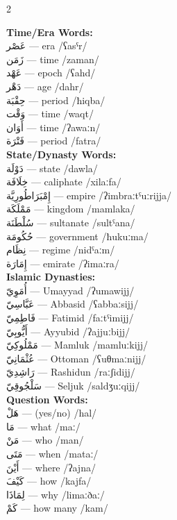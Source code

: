 \documentclass[letterpaper,12pt]{article}
\begin{document}
\begin{multicols}{2}

\textbf{Time/Era Words:}\\
\textarabic{عَصْر} — era /ʕasˤr/\\
\textarabic{زَمَن} — time /zaman/\\
\textarabic{عَهْد} — epoch /ʕahd/\\
\textarabic{دَهْر} — age /dahr/\\
\textarabic{حِقْبَة} — period /ħiqba/\\
\textarabic{وَقْت} — time /waqt/\\
\textarabic{أَوَان} — time /ʔawaːn/\\
\textarabic{فَتْرَة} — period /fatra/\\

\textbf{State/Dynasty Words:}\\
\textarabic{دَوْلَة} — state /dawla/\\
\textarabic{خِلَافَة} — caliphate /xilaːfa/\\
\textarabic{إِمْبَرَاطُورِيَّة} — empire /ʔimbraːtˤuːrijja/\\
\textarabic{مَمْلَكَة} — kingdom /mamlaka/\\
\textarabic{سُلْطَنَة} — sultanate /sultˤana/\\
\textarabic{حُكُومَة} — government /ħukuːma/\\
\textarabic{نِظَام} — regime /nidˤaːm/\\
\textarabic{إِمَارَة} — emirate /ʔimaːra/\\

\textbf{Islamic Dynasties:}\\
\textarabic{أُمَوِيّ} — Umayyad /ʔumawijj/\\
\textarabic{عَبَّاسِيّ} — Abbasid /ʕabbaːsijj/\\
\textarabic{فَاطِمِيّ} — Fatimid /faːtˤimijj/\\
\textarabic{أَيُّوبِيّ} — Ayyubid /ʔajjuːbijj/\\
\textarabic{مَمْلُوكِيّ} — Mamluk /mamluːkijj/\\
\textarabic{عُثْمَانِيّ} — Ottoman /ʕuθmaːnijj/\\
\textarabic{رَاشِدِيّ} — Rashidun /raːʃidijj/\\
\textarabic{سَلْجُوقِيّ} — Seljuk /saldʒuːqijj/\\

\textbf{Question Words:}\\
\textarabic{هَلْ} — (yes/no) /hal/\\
\textarabic{مَا} — what /maː/\\
\textarabic{مَنْ} — who /man/\\
\textarabic{مَتَى} — when /mataː/\\
\textarabic{أَيْنَ} — where /ʔajna/\\
\textarabic{كَيْفَ} — how /kajfa/\\
\textarabic{لِمَاذَا} — why /limaːðaː/\\
\textarabic{كَمْ} — how many /kam/\\


\end{multicols}
\end{document}
